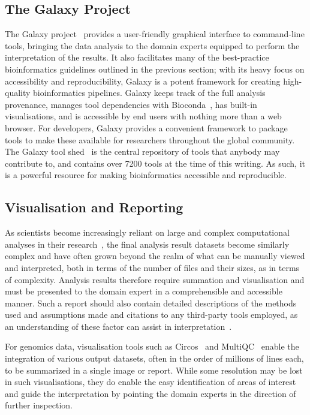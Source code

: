 \begin{justify}
\subsection{The Galaxy Project}
The Galaxy project~\cite{afgan2016galaxy} provides a user-friendly graphical interface to command-line tools, bringing the data analysis to the domain experts equipped to perform the interpretation of the results. It also facilitates many of the best-practice bioinformatics guidelines outlined in the previous section; with its heavy focus on accessibility and reproducibility, Galaxy is a potent framework for creating high-quality bioinformatics pipelines. Galaxy keeps track of the full analysis provenance, manages tool dependencies with Bioconda~\cite{gruning2017bioconda}, has built-in visualisations, and is accessible by end users with nothing more than a web browser. For developers, Galaxy provides a convenient framework to package tools to make these available for researchers throughout the global community. The Galaxy tool shed~\cite{url-toolshed} is the central repository of tools that anybody may contribute to, and contains over 7200 tools at the time of this writing. As such, it is a powerful resource for making bioinformatics accessible and reproducible.

\subsection{Visualisation and Reporting}
As scientists become increasingly reliant on large and complex computational analyses in their research~\cite{chen2014big}, the final analysis result datasets become similarly complex and have often grown beyond the realm of what can be manually viewed and interpreted, both in terms of the number of files and their sizes, as in terms of complexity. Analysis results therefore require summation and visualisation and must be presented to the domain expert in a comprehensible and accessible manner. Such a report should also contain detailed descriptions of the methods used and assumptions made and citations to any third-party tools employed, as an understanding of these factor can assist in interpretation~\cite{kumar2007bioinformatics}.

For genomics data, visualisation tools such as Circos~\cite{circos} and MultiQC~\cite{ewels2016multiqc} enable the integration of various output datasets, often in the order of millions of lines each, to be summarized in a single image or report. While some resolution may be lost in such visualisations, they do enable the easy identification of areas of interest and guide the interpretation by pointing the domain experts in the direction of further inspection.



\end{justify}
